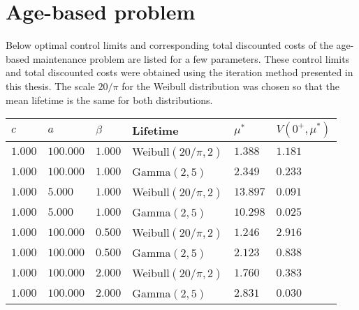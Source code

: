 \section{Age-based problem}
Below optimal control limits and corresponding total discounted costs of the age-based maintenance problem are listed for a few parameters.
These control limits and total discounted costs were obtained using the iteration method presented in this thesis.
The scale $20/\pi$ for the Weibull distribution was chosen so that the mean lifetime is the same for both distributions.

	\begin{tabularx}{\linewidth}{llllll}\label{table:AgeComputations}
		$c$        & $a$ & $\beta$ & Lifetime & $\mu^*$ & $V(0^+,\mu^*)$        \\
		\hline                       
		$1.000$ & $100.000$ & $1.000$ & Weibull$(20/\pi,2)$ & $1.388$ & $1.181$ \\ 
		$1.000$ & $100.000$ & $1.000$ & Gamma$(2,5)$ & $2.349$ & $0.233$ \\ 
		$1.000$ & $5.000$ & $1.000$ & Weibull$(20/\pi,2)$ & $13.897$ & $0.091$ \\ 
		$1.000$ & $5.000$ & $1.000$ & Gamma$(2,5)$ & $10.298$ & $0.025$ \\ 
		$1.000$ & $100.000$ & $0.500$ & Weibull$(20/\pi,2)$ & $1.246$ & $2.916$ \\ 
		$1.000$ & $100.000$ & $0.500$ & Gamma$(2,5)$ & $2.123$ & $0.838$ \\ 
		$1.000$ & $100.000$ & $2.000$ & Weibull$(20/\pi,2)$ & $1.760$ & $0.383$ \\ 
		$1.000$ & $100.000$ & $2.000$ & Gamma$(2,5)$ & $2.831$ & $0.030$ \\ 
	\end{tabularx}

